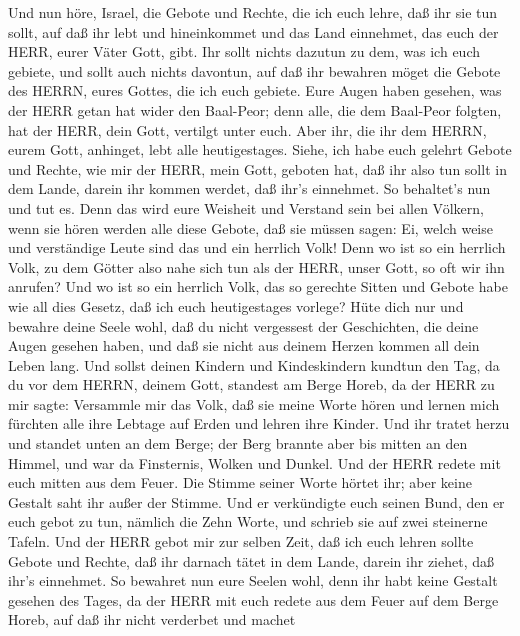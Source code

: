  Und nun höre, Israel, die Gebote und Rechte, die ich euch
lehre, daß ihr sie tun sollt, auf daß ihr lebt und hineinkommet und das
Land einnehmet, das euch der HERR, eurer Väter Gott, gibt. 
Ihr sollt nichts dazutun zu dem, was ich euch gebiete, und sollt auch
nichts davontun, auf daß ihr bewahren möget die Gebote des HERRN, eures
Gottes, die ich euch gebiete.  Eure Augen haben gesehen, was
der HERR getan hat wider den Baal-Peor; denn alle, die dem Baal-Peor
folgten, hat der HERR, dein Gott, vertilgt unter euch.  Aber
ihr, die ihr dem HERRN, eurem Gott, anhinget, lebt alle heutigestages.
 Siehe, ich habe euch gelehrt Gebote und Rechte, wie mir der
HERR, mein Gott, geboten hat, daß ihr also tun sollt in dem Lande,
darein ihr kommen werdet, daß ihr's einnehmet.  So
behaltet's nun und tut es. Denn das wird eure Weisheit und Verstand sein
bei allen Völkern, wenn sie hören werden alle diese Gebote, daß sie
müssen sagen: Ei, welch weise und verständige Leute sind das und ein
herrlich Volk!  Denn wo ist so ein herrlich Volk, zu dem
Götter also nahe sich tun als der HERR, unser Gott, so oft wir ihn
anrufen?  Und wo ist so ein herrlich Volk, das so gerechte
Sitten und Gebote habe wie all dies Gesetz, daß ich euch heutigestages
vorlege?  Hüte dich nur und bewahre deine Seele wohl, daß du
nicht vergessest der Geschichten, die deine Augen gesehen haben, und daß
sie nicht aus deinem Herzen kommen all dein Leben lang. Und sollst
deinen Kindern und Kindeskindern kundtun  den Tag, da du
vor dem HERRN, deinem Gott, standest am Berge Horeb, da der HERR zu mir
sagte: Versammle mir das Volk, daß sie meine Worte hören und lernen mich
fürchten alle ihre Lebtage auf Erden und lehren ihre Kinder.
 Und ihr tratet herzu und standet unten an dem Berge; der
Berg brannte aber bis mitten an den Himmel, und war da Finsternis,
Wolken und Dunkel.  Und der HERR redete mit euch mitten aus
dem Feuer. Die Stimme seiner Worte hörtet ihr; aber keine Gestalt saht
ihr außer der Stimme.  Und er verkündigte euch seinen Bund,
den er euch gebot zu tun, nämlich die Zehn Worte, und schrieb sie auf
zwei steinerne Tafeln.  Und der HERR gebot mir zur selben
Zeit, daß ich euch lehren sollte Gebote und Rechte, daß ihr darnach
tätet in dem Lande, darein ihr ziehet, daß ihr's einnehmet.
 So bewahret nun eure Seelen wohl, denn ihr habt keine
Gestalt gesehen des Tages, da der HERR mit euch redete aus dem Feuer auf
dem Berge Horeb,  auf daß ihr nicht verderbet und machet
